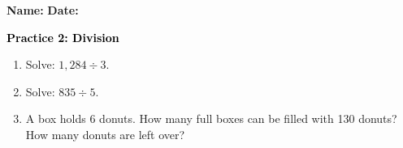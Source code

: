 \documentclass[12pt, letterpaper, fleqn]{article}
\begin{document}
\textbf{Name:} \underline{\hspace{5cm}}
\hfill
\textbf{Date:} \underline{\hspace{3cm}}\\

\begin{tcolorbox}[colback=customteal!20]
    \large\textcolor{black}{\textbf{Practice 2: Division}}
\end{tcolorbox}
\begin{enumerate}[itemsep=3.5cm, leftmargin=0.6cm]
\item Solve: $1,284 \div 3$.
\vspace{3.5cm}
\item Solve: $835 \div 5$.
\vspace{3.5cm}
\item A box holds 6 donuts. How many full boxes can be filled with 130 donuts? How many donuts are left over?
\end{enumerate}
\end{document}
